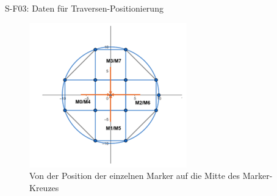   S-F03: Daten für Traversen-Positionierung

  \begin{figure}[H]
    \centering
    \includegraphics[width=0.5\linewidth]{graphics/MitteAnforderung.png}
    \caption{Von der Position der einzelnen Marker auf die Mitte des Marker-Kreuzes}
    \label{fig:MitteAnforderung}
\end{figure}


